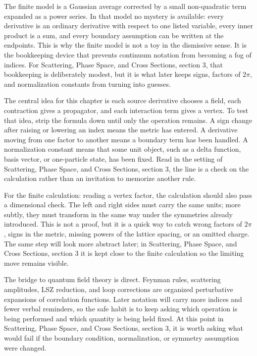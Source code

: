 The finite model is a Gaussian average corrected by a small non-quadratic term expanded as a power series.  In that model no mystery is available: every derivative is an ordinary derivative with respect to one listed variable, every inner product is a sum, and every boundary assumption can be written at the endpoints.  This is why the finite model is not a toy in the dismissive sense.  It is the bookkeeping device that prevents continuum notation from becoming a fog of indices.  For Scattering, Phase Space, and Cross Sections, section 3, that bookkeeping is deliberately modest, but it is what later keeps signs, factors of \(2\pi\), and normalization constants from turning into guesses.

The central idea for this chapter is each source derivative chooses a field, each contraction gives a propagator, and each interaction term gives a vertex.  To test that idea, strip the formula down until only the operation remains.  A sign change after raising or lowering an index means the metric has entered.  A derivative moving from one factor to another means a boundary term has been handled.  A normalization constant means that some unit object, such as a delta function, basis vector, or one-particle state, has been fixed.  Read in the setting of Scattering, Phase Space, and Cross Sections, section 3, the line is a check on the calculation rather than an invitation to memorize another rule.

For the finite calculation: reading a vertex factor, the calculation should also pass a dimensional check.  The left and right sides must carry the same units; more subtly, they must transform in the same way under the symmetries already introduced.  This is not a proof, but it is a quick way to catch wrong factors of \(2\pi\), signs in the metric, missing powers of the lattice spacing, or an omitted charge.  The same step will look more abstract later; in Scattering, Phase Space, and Cross Sections, section 3 it is kept close to the finite calculation so the limiting move remains visible.

The bridge to quantum field theory is direct.  Feynman rules, scattering amplitudes, LSZ reduction, and loop corrections are organized perturbative expansions of correlation functions.  Later notation will carry more indices and fewer verbal reminders, so the safe habit is to keep asking which operation is being performed and which quantity is being held fixed.  At this point in Scattering, Phase Space, and Cross Sections, section 3, it is worth asking what would fail if the boundary condition, normalization, or symmetry assumption were changed.

